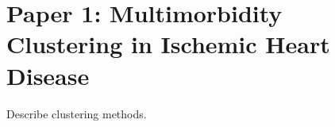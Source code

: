\chapter{Paper 1: Multimorbidity Clustering in Ischemic Heart Disease}
\label{chap:outline-paper-1}

Describe clustering methods.
